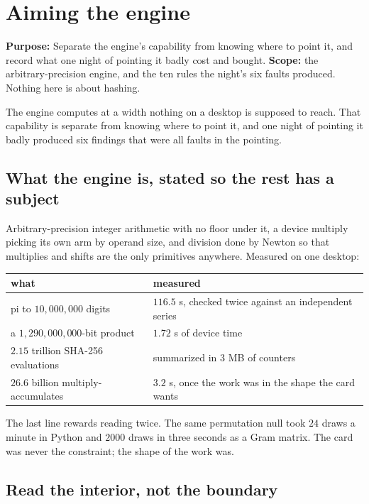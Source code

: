 \chapter{Aiming the engine}

\textbf{Purpose:} Separate the engine's capability from knowing where to point it, and record what one night of pointing it badly cost and bought. \textbf{Scope:} the arbitrary-precision engine, and the ten rules the night's six faults produced. Nothing here is about hashing.

The engine computes at a width nothing on a desktop is supposed to reach. That capability is separate from knowing where to point it, and one night of pointing it badly produced six findings that were all faults in the pointing.

\section{What the engine is, stated so the rest has a subject}

Arbitrary-precision integer arithmetic with no floor under it, a device multiply picking its own arm by operand size, and division done by Newton so that multiplies and shifts are the only primitives anywhere. Measured on one desktop:

\begin{center}
\begin{tabular}{@{}ll@{}}
\toprule
what & measured \\
\midrule
pi to \(10{,}000{,}000\) digits & \(116.5\) s, checked twice against an independent series \\
a \(1{,}290{,}000{,}000\)-bit product & \(1.72\) s of device time \\
\(2.15\) trillion SHA-256 evaluations & summarized in \(3\) MB of counters \\
\(26.6\) billion multiply-accumulates & \(3.2\) s, once the work was in the shape the card wants \\
\bottomrule
\end{tabular}
\end{center}

The last line rewards reading twice. The same permutation null took \(24\) draws a minute in Python and \(2000\) draws in three seconds as a Gram matrix. The card was never the constraint; the shape of the work was.

\section{Read the interior, not the boundary}

